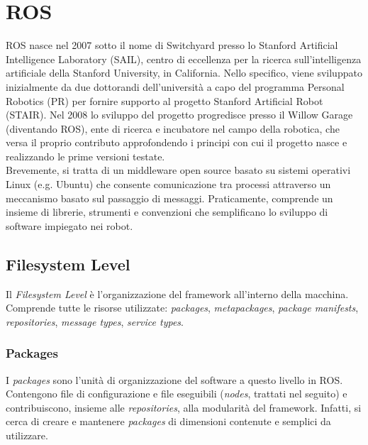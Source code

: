 
\chapter{ROS}\label{ch:ros}
\ac{ROS} \cite{ROS} nasce nel 2007 sotto il nome di Switchyard presso lo Stanford Artificial Intelligence Laboratory (SAIL), centro di eccellenza per la ricerca sull'intelligenza artificiale della Stanford University, in California. Nello specifico, viene sviluppato inizialmente da due dottorandi dell'università a capo del programma Personal Robotics (PR) per fornire supporto al progetto Stanford Artificial Robot (STAIR). Nel 2008 lo sviluppo del progetto progredisce presso il Willow Garage (diventando \acs{ROS}), ente di ricerca e incubatore nel campo della robotica, che versa il proprio contributo approfondendo i principi con cui il progetto nasce e realizzando le prime versioni testate.\\

Brevemente, si tratta di un middleware open source basato su sistemi operativi Linux (e.g. Ubuntu) che consente comunicazione tra processi attraverso un meccanismo basato sul passaggio di messaggi. Praticamente, comprende un insieme di librerie, strumenti e convenzioni che semplificano lo sviluppo di software impiegato nei robot.


\section{Filesystem Level}
Il \emph{Filesystem Level} è l'organizzazione del framework all'interno della macchina. Comprende tutte le risorse utilizzate: \emph{packages}, \emph{metapackages}, \emph{package manifests}, \emph{repositories}, \emph{message types}, \emph{service types}.

\subsection{Packages}
I \emph{packages} sono l'unità di organizzazione del software a questo livello in \acs{ROS}. Contengono file di configurazione e file eseguibili (\emph{nodes}, trattati nel seguito) e contribuiscono, insieme alle \emph{repositories}, alla modularità del framework. Infatti, si cerca di creare e mantenere \emph{packages} di dimensioni contenute e semplici da utilizzare.


